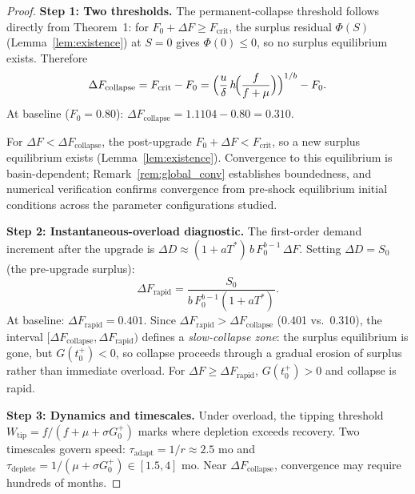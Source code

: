 \documentclass[msom,dblanonrev]{informs4}
\begin{document}
\begin{proof}
\textbf{Step 1: Two thresholds.} The permanent-collapse threshold follows directly from Theorem~1: for $F_0 + \Delta F \geq F_{\mathrm{crit}}$, the surplus residual $\Phi(S)$ (Lemma~\ref{lem:existence}) at $S=0$ gives $\Phi(0) \leq 0$, so no surplus equilibrium exists. Therefore
\[
   \Delta F_{\mathrm{collapse}} = F_{\mathrm{crit}} - F_0
     = \Bigl(\frac{u}{\delta}\,h\!\Bigl(\frac{f}{f+\mu}\Bigr)\Bigr)^{1/b} - F_0.
\]
At baseline ($F_0=0.80$): $\Delta F_{\mathrm{collapse}} = 1.1104 - 0.80 = 0.310$.

For $\Delta F < \Delta F_{\mathrm{collapse}}$, the post-upgrade $F_0+\Delta F < F_{\mathrm{crit}}$, so a new surplus equilibrium exists (Lemma~\ref{lem:existence}). Convergence to this equilibrium is basin-dependent; Remark~\ref{rem:global_conv} establishes boundedness, and numerical verification confirms convergence from pre-shock equilibrium initial conditions across the parameter configurations studied.

\textbf{Step 2: Instantaneous-overload diagnostic.} The first-order demand increment after the upgrade is $\Delta D \approx (1+aT^*)\,b\,F_0^{b-1}\,\Delta F$. Setting $\Delta D = S_0$ (the pre-upgrade surplus):
\begin{equation}\label{ec:DFrapid}
   \Delta F_{\mathrm{rapid}} = \frac{S_0}{b\,F_0^{b-1}(1+aT^*)}.
\end{equation}
At baseline: $\Delta F_{\mathrm{rapid}} = 0.401$. Since $\Delta F_{\mathrm{rapid}} > \Delta F_{\mathrm{collapse}}$ (0.401 vs.\ 0.310), the interval $[\Delta F_{\mathrm{collapse}},\Delta F_{\mathrm{rapid}})$ defines a \emph{slow-collapse zone}: the surplus equilibrium is gone, but $G(t_0^+) < 0$, so collapse proceeds through a gradual erosion of surplus rather than immediate overload. For $\Delta F \geq \Delta F_{\mathrm{rapid}}$, $G(t_0^+) > 0$ and collapse is rapid.

\textbf{Step 3: Dynamics and timescales.} Under overload, the tipping threshold $W_{\mathrm{tip}} = f/(f+\mu+\sigma G_0^+)$ marks where depletion exceeds recovery. Two timescales govern speed: $\tau_{\mathrm{adapt}} = 1/r \approx 2.5$ mo and $\tau_{\mathrm{deplete}} = 1/(\mu+\sigma G_0^+) \in [1.5,4]$ mo. Near $\Delta F_{\mathrm{collapse}}$, convergence may require hundreds of months.


\end{proof}
\end{document}
